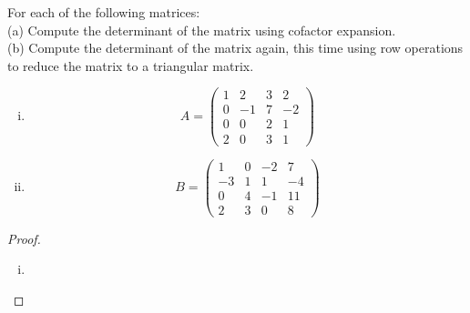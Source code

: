 \begin{question}

\normalfont
For each of the following matrices: \\
\noindent (a) Compute the determinant of the matrix using cofactor expansion. \\
\noindent (b) Compute the determinant of the matrix again, this time using row operations to reduce the matrix to a triangular matrix. \\
\begin{enumerate}[(i)]
\item
\[
A= \begin{pmatrix}
			1 & 2 & 3 & 2\\
			0 & -1 & 7 & -2\\
			0 & 0 & 2 & 1\\
			2 & 0 & 3 & 1	
		\end{pmatrix}
\]
\item
\[
B= \begin{pmatrix}
			1 & 0 & -2 & 7\\
			-3 & 1 & 1 & -4\\
			0 & 4 & -1 & 11\\
			2 & 3 & 0 & 8	
		\end{pmatrix}
\]

\end{enumerate}
\end{question}
\begin{proof}
    \renewcommand{\qedsymbol}{$\blacksquare$}
    \begin{enumerate}[(i)]
        \item 
    \end{enumerate}
    
    \renewcommand{\qedsymbol}{}
\end{proof}
